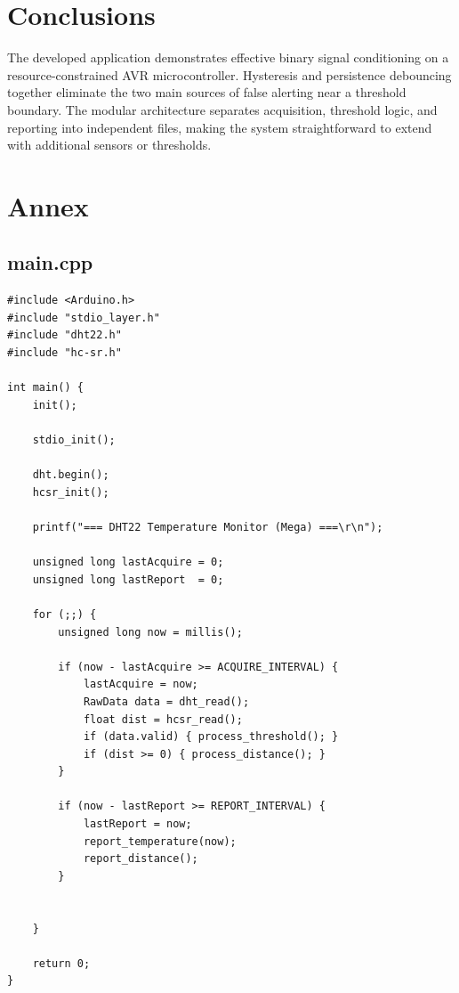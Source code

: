 \documentclass[12pt,a4paper]{article}
\begin{document}
\section{Conclusions}

The developed application demonstrates effective binary signal conditioning on a
resource-constrained AVR microcontroller. Hysteresis and persistence debouncing together
eliminate the two main sources of false alerting near a threshold boundary. The modular
architecture separates acquisition, threshold logic, and reporting into independent files,
making the system straightforward to extend with additional sensors or thresholds.

\newpage
\section{Annex}

\subsection{main.cpp}
\begin{lstlisting}
#include <Arduino.h>
#include "stdio_layer.h"
#include "dht22.h"
#include "hc-sr.h"

int main() {
    init();

    stdio_init();

    dht.begin();
    hcsr_init();

    printf("=== DHT22 Temperature Monitor (Mega) ===\r\n");

    unsigned long lastAcquire = 0;
    unsigned long lastReport  = 0;

    for (;;) {
        unsigned long now = millis();

        if (now - lastAcquire >= ACQUIRE_INTERVAL) {
            lastAcquire = now;
            RawData data = dht_read();
            float dist = hcsr_read();
            if (data.valid) { process_threshold(); }
            if (dist >= 0) { process_distance(); }
        }

        if (now - lastReport >= REPORT_INTERVAL) {
            lastReport = now;
            report_temperature(now);
            report_distance();
        }


    }

    return 0;
}
\end{lstlisting}
\end{document}
